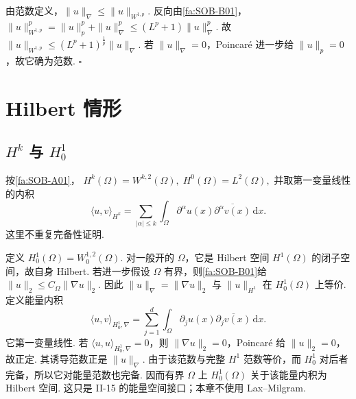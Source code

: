 \begin{FAProof}
由范数定义，\(\displaystyle\|u\|_\nabla\leqslant\|u\|_{W^{1,p}}\). 反向由\autoref{fa:SOB-B01}， \(\displaystyle \|u\|_{W^{1,p}}^p = \|u\|_p^p+\|u\|_\nabla^p \leqslant (L^p+1)\|u\|_\nabla^p.\)
故 \(\displaystyle\|u\|_{W^{1,p}}\leqslant(L^p+1)^{\frac{1}{p}}\|u\|_\nabla\). 若 \(\displaystyle\|u\|_\nabla=0\)，Poincaré 进一步给 \(\displaystyle\|u\|_p=0\)，故它确为范数.
\hfill\(\square\)
\end{FAProof}

\section{Hilbert 情形}\label{sec:ii13-hilbert-case}

\subsection{\texorpdfstring{\(\displaystyle H^k\)}{Hk} 与 \texorpdfstring{\(\displaystyle H_0^1\)}{H01}}

按\autoref{fa:SOB-A01}， \(\displaystyle H^k(\Omega)=W^{k,2}(\Omega), \; H^0(\Omega)=L^2(\Omega),\)
并取第一变量线性的内积
\[
\langle u,v\rangle_{H^k}
=
\sum_{|\alpha|\leqslant k}
\int_\Omega
\partial^\alpha u(x)
\overline{\partial^\alpha v(x)}
\,\mathrm{d}x.
\]
这里不重复完备性证明.

\begin{FAExample}
定义 \(\displaystyle H_0^1(\Omega) = W_0^{1,2}(\Omega).\)
对一般开的 \(\displaystyle\Omega\)，它是 Hilbert 空间 \(\displaystyle H^1(\Omega)\) 的闭子空间，故自身 Hilbert. 若进一步假设 \(\displaystyle\Omega\) 有界，则\autoref{fa:SOB-B01}给 \(\displaystyle \|u\|_2 \leqslant C_\Omega\|\nabla u\|_2.\)
因此 \(\displaystyle \|u\|_\nabla = \|\nabla u\|_2\)
与 \(\displaystyle\|u\|_{H^1}\) 在 \(\displaystyle H_0^1(\Omega)\) 上等价. 定义能量内积
\[
\langle u,v\rangle_{H_0^1,\nabla}
=
\sum_{j=1}^d
\int_\Omega
\partial_ju(x)
\overline{\partial_jv(x)}
\,\mathrm{d}x.
\]
它第一变量线性. 若 \(\displaystyle\langle u,u\rangle_{H_0^1,\nabla}=0\)，则 \(\displaystyle\|\nabla u\|_2=0\)，Poincaré 给 \(\displaystyle\|u\|_2=0\)，故正定. 其诱导范数正是 \(\displaystyle\|u\|_\nabla\). 由于该范数与完整 \(\displaystyle H^1\) 范数等价，而 \(\displaystyle H_0^1\) 对后者完备，所以它对能量范数也完备. 因而有界 \(\displaystyle\Omega\) 上 \(\displaystyle H_0^1(\Omega)\) 关于该能量内积为 Hilbert 空间. 这只是 II-15 的能量空间接口；本章不使用 Lax--Milgram.
\end{FAExample}


